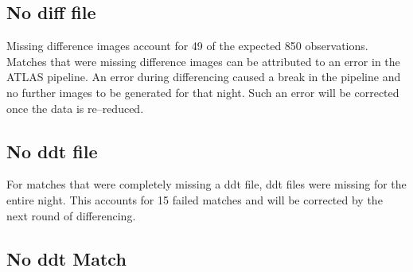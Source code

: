 \subsection{No diff file}
\indent Missing difference images account for 49 of the expected 850 observations. 
Matches that were missing difference images can be attributed to an error in the 
ATLAS pipeline. An error during differencing caused a break in the pipeline and no 
further images to be generated for that night. Such an error will be corrected once 
the data is re--reduced.


\subsection{No ddt file}
\indent For matches that were completely missing a ddt file, ddt files were missing 
for the entire night. This accounts for 15 failed matches and will be corrected by 
the next round of differencing.

\subsection{No ddt Match}\label{sec:noddtline}

